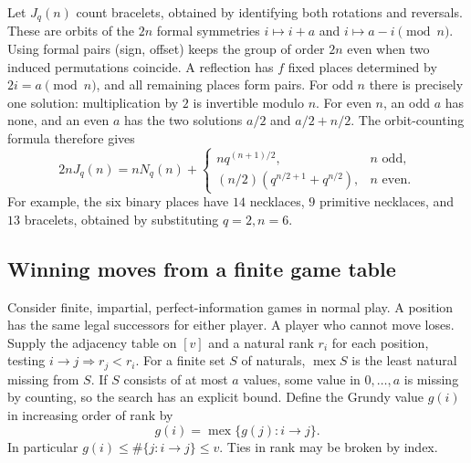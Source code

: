 Let $J_q(n)$ count bracelets, obtained by identifying both rotations and
reversals. These are orbits of the $2n$ formal symmetries
$i\mapsto i+a$ and $i\mapsto a-i\pmod n$. Using formal pairs (sign,
offset) keeps the group of order $2n$ even when two induced permutations
coincide. A reflection has $f$ fixed places determined by $2i=a\pmod n$,
and all remaining places form pairs. For odd $n$ there is precisely one
solution: multiplication by $2$ is invertible modulo $n$. For even $n$,
an odd $a$ has none, and an even $a$ has the two solutions $a/2$ and
$a/2+n/2$. The orbit-counting formula therefore gives
\[
 2n J_q(n)= n N_q(n)+
 \begin{cases}
 n q^{(n+1)/2},& n\text{ odd},\\
 (n/2)(q^{n/2+1}+q^{n/2}),& n\text{ even}.
 \end{cases}
\]
For example, the six binary places have $14$ necklaces, $9$ primitive
necklaces, and $13$ bracelets, obtained by substituting $q=2,n=6$.

\subsection{Winning moves from a finite game table}
Consider finite, impartial, perfect-information games in normal play.
A position has the same legal successors for either player. A player who
cannot move loses. Supply the adjacency table on $[v]$ and a natural
rank $r_i$ for each position, testing $i\to j\Rightarrow r_j<r_i$.
For a finite set $S$ of naturals, $\operatorname{mex} S$ is the least
natural missing from $S$. If $S$ consists of at most $a$ values, some
value in $0,\ldots,a$ is missing by counting, so the search has an explicit
bound. Define the Grundy value $g(i)$ in increasing order of rank by
\[
 g(i)=\operatorname{mex}\{g(j):i\to j\}.
\]
In particular $g(i)\le\#\{j:i\to j\}\le v$. Ties in rank may be broken
by index.


